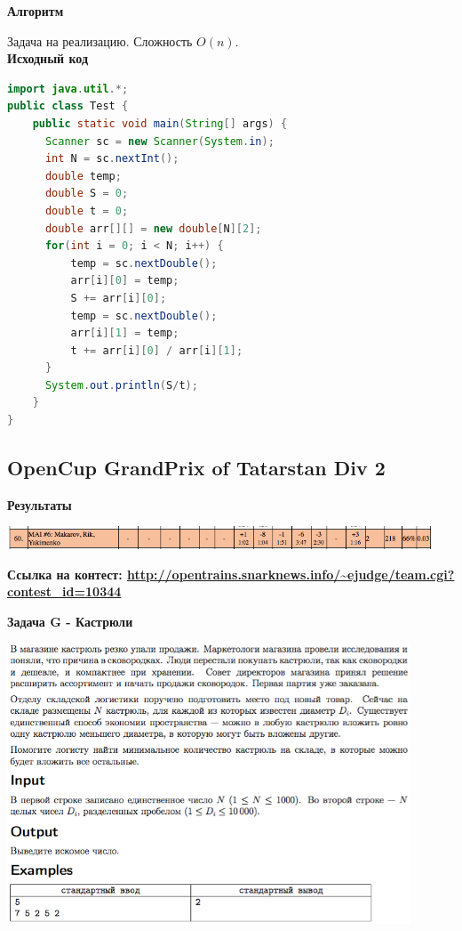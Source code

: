 \documentclass[a4paper,12pt]{article}
\begin{document}
\textbf{{\large Алгоритм}}

Задача на реализацию. Сложность $O(n)$. \\
\newpage
\textbf{{\large Исходный код}} \\
\begin{lstlisting}[language=Java]
import java.util.*;
public class Test {
    public static void main(String[] args) {
      Scanner sc = new Scanner(System.in);
      int N = sc.nextInt();
      double temp;
      double S = 0;
      double t = 0;      
      double arr[][] = new double[N][2];
      for(int i = 0; i < N; i++) {
          temp = sc.nextDouble();
          arr[i][0] = temp;
          S += arr[i][0];    
          temp = sc.nextDouble();
          arr[i][1] = temp;
          t += arr[i][0] / arr[i][1];
      }
      System.out.println(S/t);
    }
}
\end{lstlisting}






%
%
\newpage
\subsection{OpenCup GrandPrix of Tatarstan Div 2}

\textbf{{\large Результаты}} \\
\begin{center}
\includegraphics[width=0.95\textwidth]{OC_Tatarstan_2016/result.png}\\ [1cm]
\end{center}

\textbf{{\large Ссылка на контест: \url{http://opentrains.snarknews.info/~ejudge/team.cgi?contest_id=10344}}}

\newpage
\textbf{{\large Задача G - Кастрюли}}

\begin{center}
\includegraphics[width=0.9\textwidth]{OC_Tatarstan_2016/G.png}\\ [1cm]
\end{center}
\end{document}
